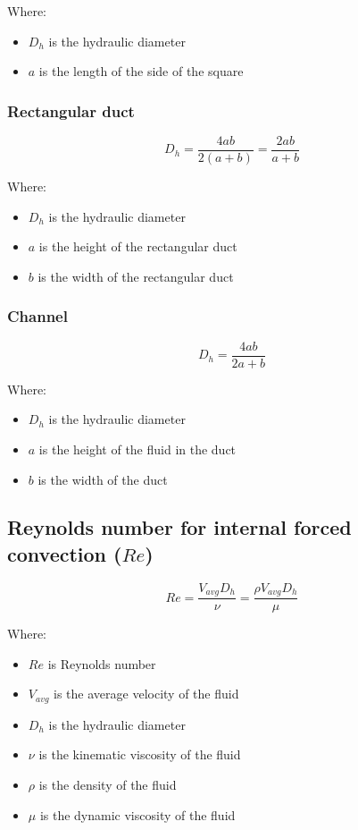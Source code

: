 \documentclass[11pt]{article}
\begin{document}
Where:
\begin{itemize}
\item \(D_h\) is the hydraulic diameter
\item \(a\) is the length of the side of the square
\end{itemize}
\subsubsection{Rectangular duct}
\label{sec:org500ac05}
\[D_h = \frac{4ab}{2(a + b)} = \frac{2ab}{a + b}\]

Where:
\begin{itemize}
\item \(D_h\) is the hydraulic diameter
\item \(a\) is the height of the rectangular duct
\item \(b\) is the width of the rectangular duct
\end{itemize}
\subsubsection{Channel}
\label{sec:org17f7937}
\[D_h = \frac{4ab}{2a + b}\]

Where:
\begin{itemize}
\item \(D_h\) is the hydraulic diameter
\item \(a\) is the height of the fluid in the duct
\item \(b\) is the width of the duct
\end{itemize}

 \newpage
\subsection{Reynolds number for internal forced convection (\(Re\))}
\label{sec:org73f074f}
\[Re = \frac{V_{avg} D_h}{\nu} = \frac{\rho V_{avg} D_h}{\mu}\]

Where:
\begin{itemize}
\item \(Re\) is Reynolds number
\item \(V_{avg}\) is the average velocity of the fluid
\item \(D_h\) is the hydraulic diameter
\item \(\nu\) is the kinematic viscosity of the fluid
\item \(\rho\) is the density of the fluid
\item \(\mu\) is the dynamic viscosity of the fluid
\end{itemize}
\end{document}
